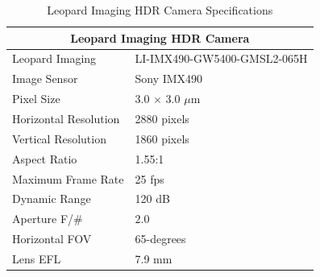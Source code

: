 \documentclass{erauthesis}
\begin{document}

\begin{table}[htpb]
\centering
\begin{tabular}{ll}
\hline
\multicolumn{2}{c}{Leopard Imaging HDR Camera}\\
\hline
\hline
Leopard Imaging & LI-IMX490-GW5400-GMSL2-065H \\
Image Sensor & Sony IMX490 \\
Pixel Size & 3.0 $\times$ 3.0 $\mu$m \\
Horizontal Resolution & 2880 pixels \\
Vertical Resolution & 1860 pixels \\
Aspect Ratio & 1.55:1 \\
Maximum Frame Rate & 25 fps \\
Dynamic Range & 120 dB \\
Aperture F/\# & $2.0$ \\
Horizontal \Ac{FOV} & 65-degrees \\ %
Lens \Ac{EFL} & 7.9 mm\\
\hline
\end{tabular}
\caption{Leopard Imaging HDR Camera Specifications}
\label{table:hdr_camera_specs}
\end{table}



\end{document}
